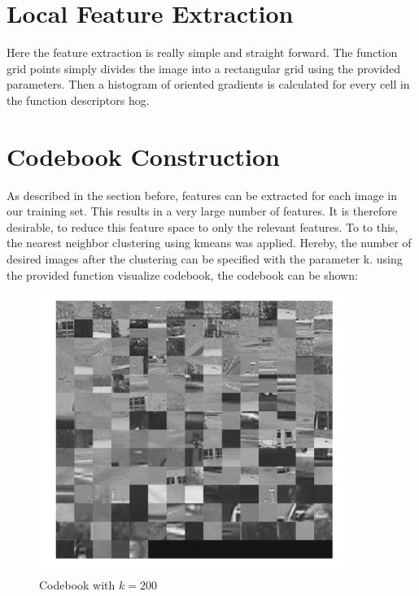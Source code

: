 \documentclass[12pt]{article}
\begin{document}
\maketitle


\section{Local Feature Extraction  }

Here the feature extraction is really simple and straight forward. The function grid points simply divides the image into a rectangular grid using the provided parameters. Then a histogram of oriented gradients is calculated for every cell in the function descriptors hog. 

\section{Codebook Construction}

As described in the section before, features can be extracted for each image in our training set. This results in a very large number of features. It is therefore desirable, to reduce this feature space to only the relevant features. To to this, the nearest neighbor clustering using kmeans was applied. Hereby, the number of desired images after the clustering can be specified with the parameter k.
\newline
using the provided function visualize codebook, the codebook can be shown: 

\vspace{5mm}
\begin{figure}[H]
	\centering
	\includegraphics[width=0.9\textwidth]{k200.jpg}
	\caption{Codebook with $k=200$}
	\label{fig1}
\end{figure}
\vspace{5mm}
\end{document}
